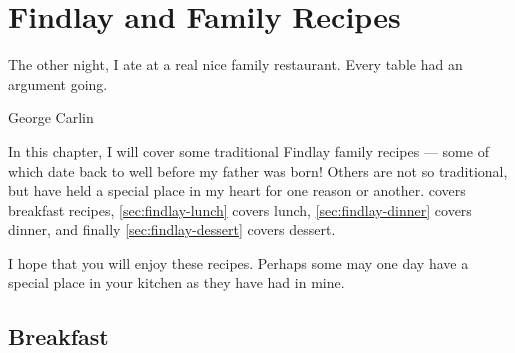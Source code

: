 \chapter{Findlay and Family Recipes}
\label{chap:findlay-recipes}

\epigraph{
The other night, I ate at a real nice family restaurant.
Every table had an argument going.
}{George Carlin}

\noindent
In this chapter, I will cover some traditional Findlay family recipes --- some
of which date back to well before my father was born! Others are not so
traditional, but have held a special place in my heart for one reason or
another.  covers breakfast recipes,
\cref{sec:findlay-lunch} covers lunch, \cref{sec:findlay-dinner} covers dinner,
and finally \cref{sec:findlay-dessert} covers dessert.

I hope that you will enjoy these recipes. Perhaps some may one day have
a special place in your kitchen as they have had in mine.

\section{Breakfast}
\label{sec:findlay-breakfast}

